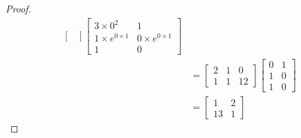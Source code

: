 \documentclass[12pt]{article}
\theoremstyle{definition}
\newtheorem{corollary}{Corollary}[theorem]
\newtheorem{lemma}[theorem]{Lemma}
\newtheorem{case}{Case}
\begin{document}
\begin{proof}
\begin{align}
\begin{bmatrix}
                        \end{bmatrix} 
                        \begin{bmatrix}
                            3 \times 0^{2}          & 1                       \\
                            1 \times e^{0 \times 1} & 0 \times e^{0 \times 1} \\
                            1                       & 0
                        \end{bmatrix} \\
                     &= \begin{bmatrix}
                            2 & 1 & 0  \\
                            1 & 1 & 12 
                        \end{bmatrix}
                        \begin{bmatrix}
                            0 & 1 \\
                            1 & 0 \\
                            1 & 0
                        \end{bmatrix} \\
                     &= \begin{bmatrix}
                            1 & 2 \\
                            13 & 1
                        \end{bmatrix} 
    \end{align}
\end{proof}

    
\end{document}
